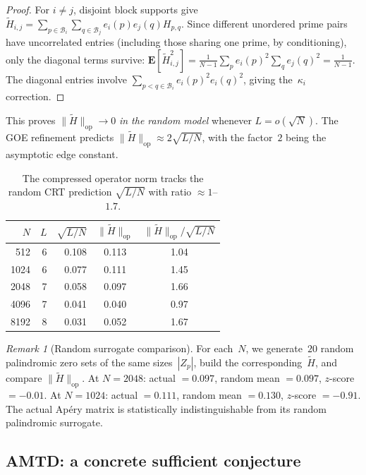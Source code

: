 \documentclass[11pt]{article}
\theoremstyle{definition}
\theoremstyle{remark}
\newtheorem{remark}[theorem]{Remark}
\begin{document}
\begin{proof}
For $i \ne j$, disjoint block supports give
$\tilde{H}_{i,j} = \sum_{p \in \mathcal{B}_i}
\sum_{q \in \mathcal{B}_j} e_i(p) e_j(q) H_{p,q}$.
Since different unordered prime pairs have uncorrelated
entries (including those sharing one prime, by
conditioning), only the diagonal terms survive:
$\mathbf{E}[\tilde{H}_{i,j}^2]
= \frac{1}{N-1}\sum_p e_i(p)^2 \sum_q e_j(q)^2
= \frac{1}{N-1}$.
The diagonal entries involve
$\sum_{p < q \in \mathcal{B}_i} e_i(p)^2 e_i(q)^2$,
giving the~$\kappa_i$ correction.
\end{proof}

This proves $\|\tilde{H}\|_{\mathrm{op}} \to 0$
\emph{in the random model} whenever $L = o(\sqrt{N})$.
The GOE refinement predicts
$\|\tilde{H}\|_{\mathrm{op}} \approx 2\sqrt{L/N}$,
with the factor~$2$ being the asymptotic edge constant.

\begin{table}[ht]
\centering
\begin{tabular}{rrrcc}
\hline
$N$ & $L$ & $\sqrt{L/N}$ &
  $\|\tilde{H}\|_{\mathrm{op}}$ &
  $\|\tilde{H}\|_{\mathrm{op}}/\sqrt{L/N}$ \\
\hline
512  & 6 & 0.108 & 0.113 & 1.04 \\
1024 & 6 & 0.077 & 0.111 & 1.45 \\
2048 & 7 & 0.058 & 0.097 & 1.66 \\
4096 & 7 & 0.041 & 0.040 & 0.97 \\
8192 & 8 & 0.031 & 0.052 & 1.67 \\
\hline
\end{tabular}
\caption{The compressed operator norm tracks
the random CRT prediction $\sqrt{L/N}$ with
ratio $\approx 1$--$1.7$.}
\label{tab:scaling}
\end{table}

\begin{remark}[Random surrogate comparison]
\label{rem:surrogate}
For each~$N$, we generate~$20$ random palindromic
zero sets of the same sizes~$|Z_p|$, build the
corresponding~$\tilde{H}$, and compare
$\|\tilde{H}\|_{\mathrm{op}}$.
At $N = 2048$: actual $= 0.097$,
random mean $= 0.097$, $z$-score $= -0.01$.
At $N = 1024$: actual $= 0.111$,
random mean $= 0.130$, $z$-score $= -0.91$.
The actual Ap\'ery matrix is statistically
indistinguishable from its random palindromic surrogate.
\end{remark}

\subsection{AMTD: a concrete sufficient conjecture}
\label{ssec:amtd}
\end{document}
